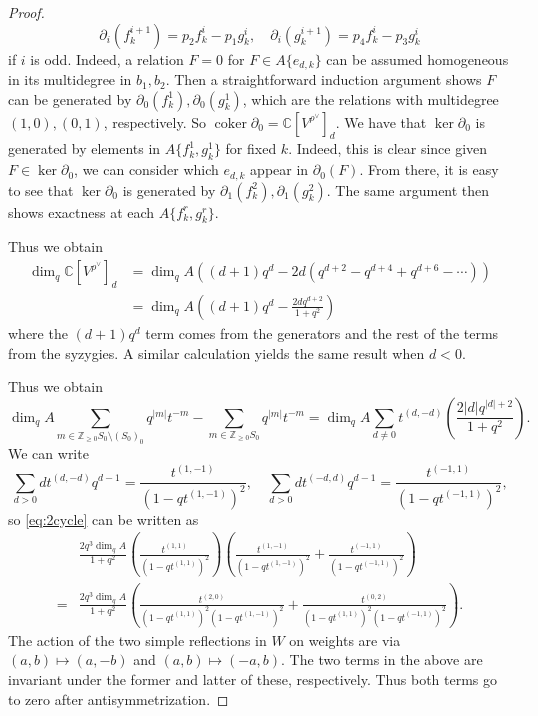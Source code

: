 \documentclass[10pt,a4paper]{amsart}
\DeclareMathOperator{\coker}{coker}
\newcommand{\C}{\mathbb{C}}
\newcommand{\Z}{\mathbb{Z}}
\begin{document}
\begin{proof}
    \[\partial_i(f_k^{i+1})=p_2f_k^i-p_1g_k^i,\quad\partial_i(g_k^{i+1})=p_4f_k^i-p_3g_k^i\]
    if $i$ is odd. Indeed, a relation $F=0$ for $F\in A\{e_{d,k}\}$ can be assumed homogeneous in its multidegree in $b_1,b_2$. Then a straightforward induction argument shows $F$ can be generated by $\partial_0(f_k^1),\partial_0(g_k^1)$, which are the relations with multidegree $(1,0),(0,1)$, respectively. So $\coker\partial_0=\C[V^{\rho^\vee}]_d$. We have that $\ker\partial_0$ is generated by elements in $A\{f_k^1,g_k^1\}$ for fixed $k$. Indeed, this is clear since given $F\in\ker\partial_0$, we can consider which $e_{d,k}$ appear in $\partial_0(F)$. From there, it is easy to see that $\ker\partial_0$ is generated by $\partial_1(f_k^2),\partial_1(g_k^2)$. The same argument then shows exactness at each $A\{f_k^r,g_k^r\}$.
    
    Thus we obtain
    \begin{align*}
        \dim_q\C[V^{\rho^\vee}]_d&=\dim_qA\left((d+1)q^d-2d(q^{d+2}-q^{d+4}+q^{d+6}-\cdots)\right)\\
        &=\dim_qA\left((d+1)q^d-\frac{2dq^{d+2}}{1+q^2}\right)
    \end{align*}
    where the $(d+1)q^d$ term comes from the generators and the rest of the terms from the syzygies. A similar calculation yields the same result when $d<0$.

    Thus we obtain
    \[\dim_qA\sum_{m\in\Z_{\geq 0}S_0\setminus(S_0)_0}q^{|m|}t^{-m}-\sum_{m\in\Z_{\geq 0}S_0}q^{|m|}t^{-m}=\dim_qA\sum_{d\neq 0}t^{(d,-d)}\left(\frac{2|d|q^{|d|+2}}{1+q^2}\right).\]
    We can write
    \[\sum_{d>0}dt^{(d,-d)}q^{d-1}=\frac{t^{(1,-1)}}{(1-qt^{(1,-1)})^2},\quad\sum_{d>0}dt^{(-d,d)}q^{d-1}=\frac{t^{(-1,1)}}{(1-qt^{(-1,1)})^2},\]
    so \eqref{eq:2cycle} can be written as
    \begin{align*}
        &\frac{2q^3\dim_qA}{1+q^2}\left(\frac{t^{(1,1)}}{(1-qt^{(1,1)})^2}\right)\left(\frac{t^{(1,-1)}}{(1-qt^{(1,-1)})^2}+\frac{t^{(-1,1)}}{(1-qt^{(-1,1)})^2}\right)\\
        =&\frac{2q^3\dim_qA}{1+q^2}\left(\frac{t^{(2,0)}}{(1-qt^{(1,1)})^2(1-qt^{(1,-1)})^2}+\frac{t^{(0,2)}}{(1-qt^{(1,1)})^2(1-qt^{(-1,1)})^2}\right).
    \end{align*}
    The action of the two simple reflections in $W$ on weights are via $(a,b)\mapsto(a,-b)$ and $(a,b)\mapsto(-a,b)$. The two terms in the above are invariant under the former and latter of these, respectively. Thus both terms go to zero after antisymmetrization.
\end{proof}
\end{document}
